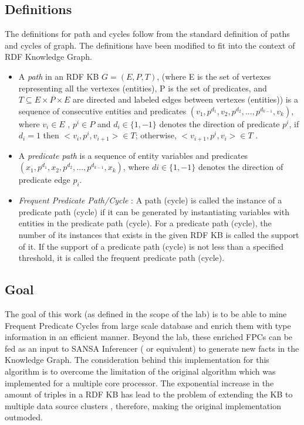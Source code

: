 \documentclass{easychair}
\begin{document}
\subsection{Definitions}
The definitions for path and cycles follow from the standard definition of paths and cycles of graph. The definitions have been modified to fit into the context of RDF Knowledge Graph. 
\begin{itemize}
\item A \emph{path} in an RDF KB $G = (E,P,T)$, (where E is the set of vertexes representing all the vertexes (entities), P is the set of predicates, and $T \subseteq {E\times P \times E}$ are directed and labeled edges between vertexes (entities)) is a sequence of consecutive entities and predicates $(v_1 , p^{d_1} , v_2 , p^{d_2} ,...,p^{d_{k-1}},v_k)$, where $v_i \in E$ , $ p^i \in P$ and  $ d_i \in \{1, - 1\}$ denotes the direction of predicate $p^i$, if $d_i = 1$ then $<v_i, p^i, v_{i+1}> \in T$; otherwise, $<v_{i+1}, p^i, v_i> \in T$ . 
\item A \emph{predicate path} is a sequence of entity variables and predicates $(x_1 , p^{d_1} , x_2 , p^{d_2} ,...,p^{d_{k-1}},x_k)$, where $di \in \{1, - 1\}$ denotes the direction of predicate edge $p_i$.
\item \emph{Frequent Predicate Path/Cycle }: A path (cycle) is called the instance of a predicate path (cycle) if it can be generated by instantiating variables with entities in the predicate path (cycle). For a predicate path (cycle), the number of its instances that exists in the given RDF KB is called the support of it. If the support of a predicate path (cycle) is not less than a specified threshold, it is called the frequent predicate path (cycle).

\end{itemize}


\subsection{Goal}
The goal of this work (as defined in the scope of the lab) is to be able to mine Frequent Predicate Cycles from large scale database and enrich them with type information in an efficient manner.  Beyond the lab, these enriched FPCs  can be fed as an input to SANSA Inferencer \cite{sansa} ( or equivalent) to generate new facts in the Knowledge Graph. 
The consideration behind this implementation for this algorithm is to overcome the limitation of the original algorithm which was implemented for a multiple core processor. The exponential increase in the amount of triples in a RDF KB  has lead to the problem of extending the KB to multiple data source clusters , therefore, making the original implementation outmoded.
\end{document}
